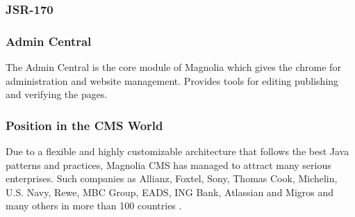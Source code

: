 \subsubsection{JSR-170}


\subsubsection{Admin Central}
The Admin Central is the core module of Magnolia which gives the chrome for
administration and website management. Provides tools for editing publishing
and verifying the pages.\cite{magnolia_shell}

\subsubsection{Position in the CMS World}
Due to a flexible and highly customizable architecture that follows the best
Java patterns and practices, Magnolia CMS has managed to attract many serious
enterprises. Such companies as Allianz, Foxtel, Sony, Thomas Cook, Michelin,
U.S. Navy, Rewe, MBC Group, EADS, ING Bank, Atlassian and Migros and many others
in more than 100 countries \cite{magnolia_customers}.
\pagebreak